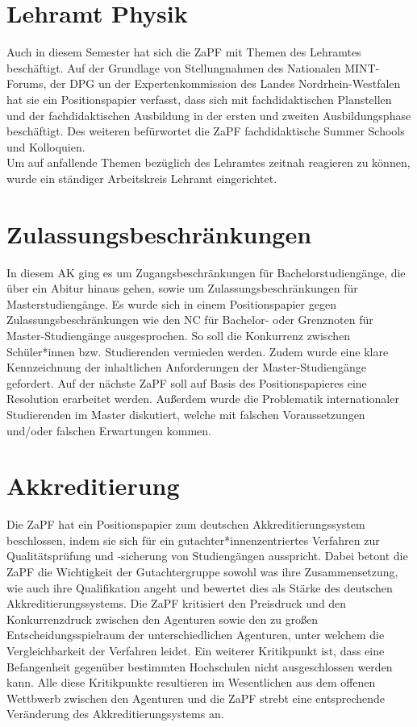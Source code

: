 \section*{Lehramt Physik}
Auch in diesem Semester hat sich die ZaPF mit Themen des Lehramtes beschäftigt. Auf der Grundlage von Stellungnahmen des Nationalen MINT-Forums, der DPG un der Expertenkommission des Landes Nordrhein-Westfalen hat sie ein Positionspapier verfasst, dass sich mit fachdidaktischen Planstellen und der fachdidaktischen Ausbildung in der ersten und zweiten Ausbildungsphase beschäftigt. Des weiteren befürwortet die ZaPF fachdidaktische Summer Schools und Kolloquien. \\
Um auf  anfallende Themen bezüglich des Lehramtes zeitnah reagieren zu können, wurde ein ständiger Arbeitskreis Lehramt eingerichtet. 


\section*{Zulassungsbeschränkungen}
In diesem AK ging es um Zugangsbeschränkungen für Bachelorstudiengänge, die über ein Abitur hinaus gehen, sowie um Zulassungsbeschränkungen für Masterstudiengänge.
Es wurde sich in einem Positionspapier gegen Zulassungsbeschränkungen wie den NC für Bachelor- oder Grenznoten für Master-Studiengänge ausgesprochen. So soll die Konkurrenz zwischen Schüler*innen bzw. Studierenden vermieden werden. Zudem wurde eine klare Kennzeichnung der inhaltlichen Anforderungen der Master-Studiengänge gefordert. Auf der nächste ZaPF soll auf Basis des Positionspapieres eine Resolution erarbeitet werden. Außerdem wurde die Problematik internationaler Studierenden im Master  diskutiert, welche mit falschen Voraussetzungen und/oder falschen Erwartungen kommen. \\


\section*{Akkreditierung}
Die ZaPF hat ein Positionspapier zum deutschen Akkreditierungssystem beschlossen, indem sie sich für ein gutachter*innenzentriertes Verfahren zur Qualitätsprüfung und -sicherung von Studiengängen ausspricht. Dabei betont die ZaPF die Wichtigkeit der Gutachtergruppe sowohl was ihre Zusammensetzung, wie auch ihre Qualifikation angeht und bewertet dies als Stärke des deutschen Akkreditierungssystems. 
Die ZaPF kritisiert den Preisdruck und den Konkurrenzdruck zwischen den Agenturen sowie den zu großen Entscheidungsspielraum der unterschiedlichen Agenturen, unter welchem die Vergleichbarkeit der Verfahren leidet. Ein weiterer Kritikpunkt ist, dass eine Befangenheit gegenüber bestimmten Hochschulen nicht ausgeschlossen werden kann. Alle diese Kritikpunkte resultieren im Wesentlichen aus dem offenen Wettbwerb zwischen den Agenturen und die ZaPF strebt eine entsprechende Veränderung des Akkreditierungsystems an.

